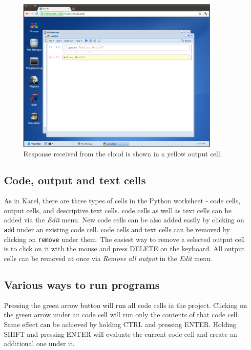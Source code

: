 \newpage

\begin{figure}[!ht]
\begin{center}
\includegraphics[width=0.9\textwidth]{imgp/python-2.png}
\end{center}
\vspace{-2mm}
\caption{Response received from the cloud is shown in a yellow output cell.}
\label{fig:python-2}
\end{figure}

\subsection{Code, output and text cells}

As in Karel, there are three types of cells in the Python worksheet - code cells, output cells, 
and descriptive text cells. code cells as well as text cells can be added via 
the {\em Edit} menu. New code cells can be also added easily by clicking on {\tt add} under
an existing code cell. code cells and text cells can be removed by clicking on 
{\tt remove} under them. The easiest way to remove a selected output cell is to 
click on it with the mouse and press DELETE on the keyboard. 
All output cells can be removed at once via {\em Remove all output} in the {\em Edit} menu. 

\subsection{Various ways to run programs}

Pressing the green arrow button will run all code cells in the project. Clicking 
on the green arrow under an code cell will run only the contents of that code cell. 
Same effect can be achieved by holding CTRL and pressing ENTER. Holding SHIFT
and pressing ENTER will evaluate the current code cell and create an additional one
under it.

